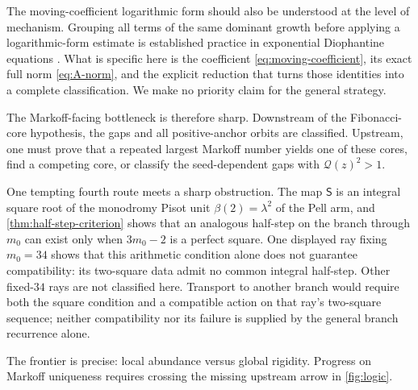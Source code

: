 The moving-coefficient logarithmic form should also be understood at the
level of mechanism. Grouping all terms of the same dominant growth before
applying a logarithmic-form estimate is established practice in exponential
Diophantine equations
\cite{DdamuliraLucaRakotomalala2016,BravoDasHerreraSaunders2026}. What is
specific here is the coefficient \cref{eq:moving-coefficient}, its exact
full norm \cref{eq:A-norm}, and the explicit reduction that turns those
identities into a complete classification. We make no priority claim for the
general strategy.

The Markoff-facing bottleneck is therefore sharp. Downstream of the
Fibonacci-core hypothesis, the gaps and all positive-anchor orbits are
classified. Upstream, one must prove that a repeated largest Markoff number
yields one of these cores, find a competing core, or classify the
seed-dependent gaps with $\mathcal Q(z)^2>1$.

One tempting fourth route meets a sharp obstruction. The map $\mathsf S$ is
an integral square root of the monodromy Pisot unit
$\beta(2)=\lambda^2$ of the Pell arm, and
\cref{thm:half-step-criterion} shows that an analogous half-step on
the branch through $m_0$ can exist only when $3m_0-2$ is a perfect square.
One displayed ray fixing $m_0=34$ shows that this arithmetic condition alone
does not guarantee compatibility: its two-square data admit no common
integral half-step. Other fixed-$34$ rays are not classified here. Transport
to another branch would require both the square condition and a compatible
action on that ray's two-square sequence; neither compatibility nor its
failure is supplied by the general branch recurrence alone.

The frontier is precise: local abundance versus global rigidity. Progress on
Markoff uniqueness requires crossing the missing upstream arrow in
\cref{fig:logic}.
